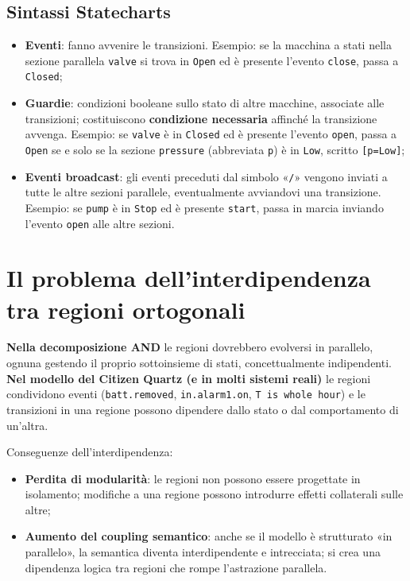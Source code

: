 \subsection{Sintassi Statecharts}
\begin{itemize}
    \item \textbf{Eventi}: fanno avvenire le transizioni. Esempio: se la macchina a stati nella sezione parallela \texttt{valve} si trova in \texttt{Open} ed è presente l'evento \texttt{close}, passa a \texttt{Closed};
    \item \textbf{Guardie}: condizioni booleane sullo stato di altre macchine, associate alle transizioni; costituiscono \textbf{condizione necessaria} affinché la transizione avvenga. Esempio: se \texttt{valve} è in \texttt{Closed} ed è presente l'evento \texttt{open}, passa a \texttt{Open} se e solo se la sezione \texttt{pressure} (abbreviata \texttt{p}) è in \texttt{Low}, scritto \texttt{[p=Low]};
    \item \textbf{Eventi broadcast}: gli eventi preceduti dal simbolo «\texttt{/}» vengono inviati a tutte le altre sezioni parallele, eventualmente avviandovi una transizione. Esempio: se \texttt{pump} è in \texttt{Stop} ed è presente \texttt{start}, passa in marcia inviando l'evento \texttt{open} alle altre sezioni.
\end{itemize}

\section{Il problema dell'interdipendenza tra regioni ortogonali}
\begin{note}
\textbf{Nella decomposizione AND} le regioni dovrebbero evolversi in parallelo, ognuna gestendo il proprio sottoinsieme di stati, concettualmente indipendenti.\\
\textbf{Nel modello del Citizen Quartz (e in molti sistemi reali)} le regioni condividono eventi (\texttt{batt.removed}, \texttt{in.alarm1.on}, \texttt{T is whole hour}) e le transizioni in una regione possono dipendere dallo stato o dal comportamento di un'altra.
\end{note}

Conseguenze dell'interdipendenza:
\begin{itemize}
    \item \textbf{Perdita di modularità}: le regioni non possono essere progettate in isolamento; modifiche a una regione possono introdurre effetti collaterali sulle altre;
    \item \textbf{Aumento del coupling semantico}: anche se il modello è strutturato «in parallelo», la semantica diventa interdipendente e intrecciata; si crea una dipendenza logica tra regioni che rompe l'astrazione parallela.
\end{itemize}


